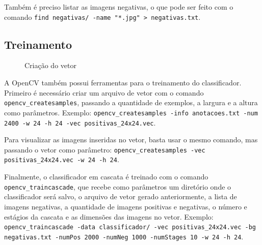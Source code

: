 Também é preciso listar as imagens negativas, o que pode ser feito com o comando \texttt{find negativas/ -name "*.jpg" > negativas.txt}.


\subsection{Treinamento}\label{sec:treinamento}

\begin{figure}[htbp]
   \caption{Criação do vetor}
   \label{fig:opencv_createsamples}
   \begin{center}
   \end{center}
\end{figure}

A OpenCV também possui ferramentas para o treinamento do classificador. 
Primeiro é necessário criar um arquivo de vetor com o comando \texttt{opencv\_createsamples}, passando a quantidade de exemplos, a largura e a altura como parâmetros. Exemplo: \texttt{opencv_createsamples -info anotacoes.txt -num 2400 -w 24 -h 24 -vec positivas_24x24.vec}.

Para visualizar as imagens inseridas no vetor, basta usar o mesmo comando, mas passando o vetor como parâmetro: \texttt{opencv_createsamples -vec positivas_24x24.vec -w 24 -h 24}.

Finalmente, o classificador em cascata é treinado com o comando \texttt{opencv\_traincascade}, que recebe como parâmetros um diretório onde o classificador será salvo, o arquivo de vetor gerado anteriormente, a lista de imagens negativas, a quantidade de imagens positivas e negativas, o número e estágios da cascata e as dimensões das imagens no vetor.
Exemplo: \texttt{opencv_traincascade -data classificador/ -vec positivas_24x24.vec -bg negativas.txt -numPos 2000 -numNeg 1000 -numStages 10 -w 24 -h 24}.

